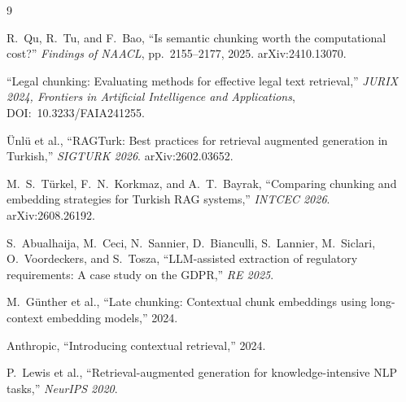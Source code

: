 \documentclass[11pt,a4paper,twocolumn]{article}
\begin{document}
\begin{thebibliography}{9}

R.~Qu, R.~Tu, and F.~Bao,
``Is semantic chunking worth the computational cost?''
\textit{Findings of NAACL}, pp.~2155--2177, 2025.
arXiv:2410.13070.

``Legal chunking: Evaluating methods for effective legal text retrieval,''
\textit{JURIX 2024, Frontiers in Artificial Intelligence and Applications},
DOI:~10.3233/FAIA241255.

Ünlü et al.,
``RAGTurk: Best practices for retrieval augmented generation in Turkish,''
\textit{SIGTURK 2026}.
arXiv:2602.03652.

M.~S.~Türkel, F.~N.~Korkmaz, and A.~T.~Bayrak,
``Comparing chunking and embedding strategies for Turkish RAG systems,''
\textit{INTCEC 2026}.
arXiv:2608.26192.

S.~Abualhaija, M.~Ceci, N.~Sannier, D.~Bianculli, S.~Lannier, M.~Siclari,
O.~Voordeckers, and S.~Tosza,
``LLM-assisted extraction of regulatory requirements: A case study on the GDPR,''
\textit{RE 2025}.

M.~Günther et al.,
``Late chunking: Contextual chunk embeddings using long-context embedding models,''
2024.

Anthropic,
``Introducing contextual retrieval,''
2024.

P.~Lewis et al.,
``Retrieval-augmented generation for knowledge-intensive NLP tasks,''
\textit{NeurIPS 2020}.

\end{thebibliography}
\end{document}
